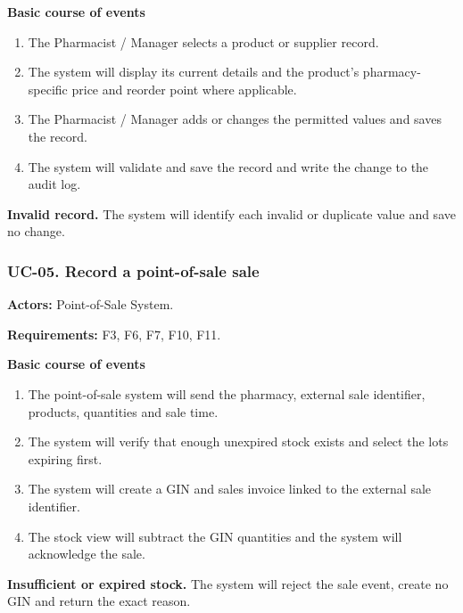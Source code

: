 \textbf{Basic course of events}
\begin{enumerate}
\item The Pharmacist / Manager selects a product or supplier record.
\item The system will display its current details and the product's pharmacy-specific price and reorder point where applicable.
\item The Pharmacist / Manager adds or changes the permitted values and saves the record.
\item The system will validate and save the record and write the change to the audit log.
\end{enumerate}

\textbf{Invalid record.} The system will identify each invalid or duplicate value and save no change.


\clearpage
\subsubsection*{UC-05. Record a point-of-sale sale}
\textbf{Actors:} Point-of-Sale System.

\textbf{Requirements:} F3, F6, F7, F10, F11.

\textbf{Basic course of events}
\begin{enumerate}
\item The point-of-sale system will send the pharmacy, external sale identifier, products, quantities and sale time.
\item The system will verify that enough unexpired stock exists and select the lots expiring first.
\item The system will create a GIN and sales invoice linked to the external sale identifier.
\item The stock view will subtract the GIN quantities and the system will acknowledge the sale.
\end{enumerate}

\textbf{Insufficient or expired stock.} The system will reject the sale event, create no GIN and return the exact reason.


